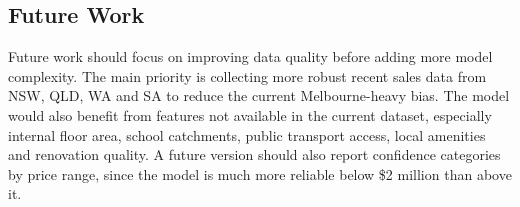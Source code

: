 \documentclass[a4paper,12pt]{article}
\begin{document}
\subsection{Future Work}

Future work should focus on improving data quality before adding more model complexity. The main priority is collecting more robust recent sales data from NSW, QLD, WA and SA to reduce the current Melbourne-heavy bias. The model would also benefit from features not available in the current dataset, especially internal floor area, school catchments, public transport access, local amenities and renovation quality. A future version should also report confidence categories by price range, since the model is much more reliable below \$2 million than above it.

\newpage
\end{document}
